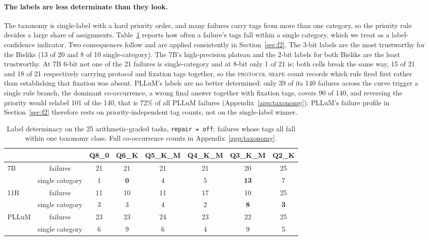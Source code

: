 \documentclass[11pt]{article}
\begin{document}
\paragraph{The labels are less determinate than they look.} The taxonomy is single-label with a hard priority order, and many failures carry tags from more than one category, so the priority rule decides a large share of assignments. Table~\ref{tab:purity} reports how often a failure's tags fall within a single category, which we treat as a label-confidence indicator. Two consequences follow and are applied consistently in Section~\ref{sec:f2}. The 3-bit labels are the most trustworthy for the Bieliks (13 of 20 and 8 of 10 single-category). The 7B's high-precision plateau and the 2-bit labels for both Bieliks are the least trustworthy. At 7B 6-bit not one of the 21 failures is single-category and at 8-bit only 1 of 21 is; both cells break the same way, 15 of 21 and 18 of 21 respectively carrying protocol and fixation tags together, so the \textsc{protocol shape} count records which rule fired first rather than establishing that fixation was absent. PLLuM's labels are no better determined: only 39 of its 140 failures across the curve trigger a single rule branch, the dominant co-occurrence, a wrong final answer together with fixation tags, covers 90 of 140, and reversing the priority would relabel 101 of the 140, that is 72\% of all PLLuM failures (Appendix~\ref{app:taxonomy}); PLLuM's failure profile in Section~\ref{sec:f2} therefore rests on priority-independent tag counts, not on the single-label winner.

\begin{table}[h]
\centering\small
\caption{Label determinacy on the 25 arithmetic-graded tasks, \texttt{repair\,=\,off}: failures whose tags all fall within one taxonomy class. Full co-occurrence counts in Appendix~\ref{app:taxonomy}.}
\label{tab:purity}
\begin{tabular}{lccccccc}
\toprule
& & Q8\_0 & Q6\_K & Q5\_K\_M & Q4\_K\_M & Q3\_K\_M & Q2\_K \\
\midrule
\multirow{2}{*}{7B}  & failures      & 21 & 21 & 21 & 21 & 20 & 25 \\
                     & single category & 1 & \textbf{0} & 4 & 5 & \textbf{13} & 7 \\
\midrule
\multirow{2}{*}{11B} & failures      & 11 & 10 & 11 & 17 & 10 & 25 \\
                     & single category & 3 & 3 & 4 & 2 & \textbf{8} & \textbf{3} \\
\midrule
\multirow{2}{*}{PLLuM} & failures    & 23 & 23 & 24 & 23 & 22 & 25 \\
                     & single category & 6 & 9 & 6 & 4 & 9 & 5 \\
\bottomrule
\end{tabular}
\end{table}
\end{document}
